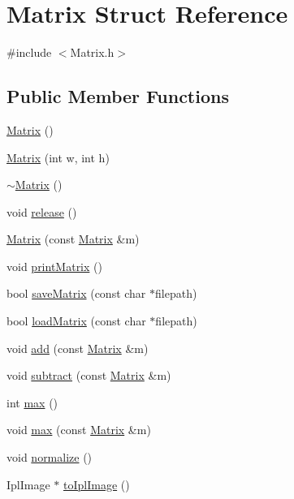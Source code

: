 \hypertarget{struct_matrix}{\section{Matrix Struct Reference}
\label{struct_matrix}
}


{\ttfamily \#include $<$Matrix.\+h$>$}

\subsection*{Public Member Functions}
\begin{DoxyCompactItemize}
\item 
\hyperlink{struct_matrix_a2dba13c45127354c9f75ef576f49269b}{Matrix} ()
\item 
\hyperlink{struct_matrix_ae940d9b978841f5f497b7b7f81c63d23}{Matrix} (int w, int h)
\item 
\hyperlink{struct_matrix_a9b1c3627f573d78a2f08623fdfef990f}{$\sim$\+Matrix} ()
\item 
void \hyperlink{struct_matrix_ab59f4a769478018f0b27663e58212ae0}{release} ()
\item 
\hyperlink{struct_matrix_a765f4dcb51b6829311cc3e7576388423}{Matrix} (const \hyperlink{struct_matrix}{Matrix} \&m)
\item 
void \hyperlink{struct_matrix_aa1967ad240a5ffaf492800044b7275d9}{print\+Matrix} ()
\item 
bool \hyperlink{struct_matrix_a81b93f9fb33df8c1158e04f126cd027b}{save\+Matrix} (const char $\ast$filepath)
\item 
bool \hyperlink{struct_matrix_a6081c47c292a9f7b2ad9b52d19448a6a}{load\+Matrix} (const char $\ast$filepath)
\item 
void \hyperlink{struct_matrix_af143c4fe4c0c4898042445ff7a1c3e7e}{add} (const \hyperlink{struct_matrix}{Matrix} \&m)
\item 
void \hyperlink{struct_matrix_a86dbacb2dbce0a0f060d42e42803b036}{subtract} (const \hyperlink{struct_matrix}{Matrix} \&m)
\item 
int \hyperlink{struct_matrix_a039ea2d4f46386c0935b5deb8002f3a4}{max} ()
\item 
void \hyperlink{struct_matrix_a84fcf597f06e429f37afc6fe20be7f3b}{max} (const \hyperlink{struct_matrix}{Matrix} \&m)
\item 
void \hyperlink{struct_matrix_a00ff4e77d40160c2d3c1f7082abff2c6}{normalize} ()
\item 
Ipl\+Image $\ast$ \hyperlink{struct_matrix_ac2889fe790b53254c2c161cdfa850ab9}{to\+Ipl\+Image} ()
\end{DoxyCompactItemize}
